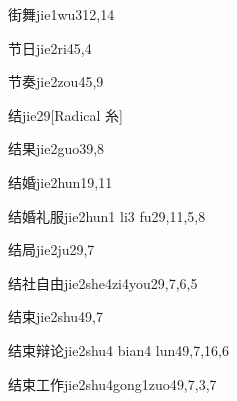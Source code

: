 \begin{entry}{街舞}{jie1wu3}{12,14}
\end{entry}

\begin{entry}{节日}{jie2ri4}{5,4}
\end{entry}

\begin{entry}{节奏}{jie2zou4}{5,9}
\end{entry}

\begin{entry}{结}{jie2}{9}[Radical 糸]
\end{entry}

\begin{entry}{结果}{jie2guo3}{9,8}
\end{entry}

\begin{entry}{结婚}{jie2hun1}{9,11}
\end{entry}

\begin{entry}{结婚礼服}{jie2hun1 li3 fu2}{9,11,5,8}
\end{entry}

\begin{entry}{结局}{jie2ju2}{9,7}
\end{entry}

\begin{entry}{结社自由}{jie2she4zi4you2}{9,7,6,5}
\end{entry}

\begin{entry}{结束}{jie2shu4}{9,7}
\end{entry}

\begin{entry}{结束辩论}{jie2shu4 bian4 lun4}{9,7,16,6}
\end{entry}

\begin{entry}{结束工作}{jie2shu4gong1zuo4}{9,7,3,7}
\end{entry}

